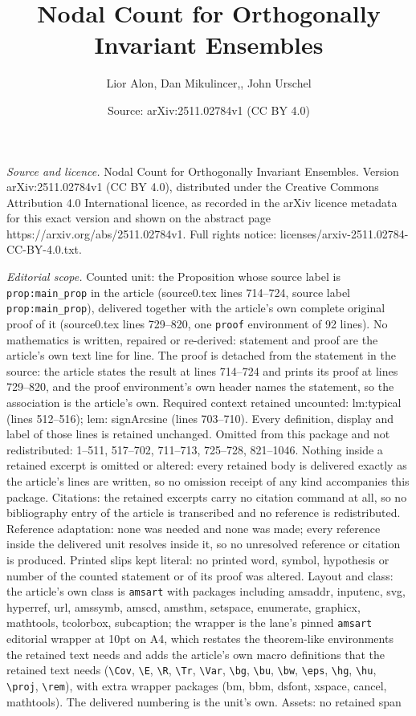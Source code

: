 \documentclass[10pt,a4paper]{amsart}
\title[Nodal Count for Orthogonally Invariant Ensembles]{Nodal Count for Orthogonally Invariant Ensembles}
\author{Lior Alon, Dan Mikulincer,, John Urschel}
\date{Source: arXiv:2511.02784v1 (CC BY 4.0)}
\begin{document}
\maketitle

\noindent\emph{Source and licence.} Nodal Count for Orthogonally Invariant Ensembles. Version arXiv:2511.02784v1 (CC BY 4.0), distributed under the Creative Commons Attribution 4.0 International licence, as recorded in the arXiv licence metadata for this exact version and shown on the abstract page https://arxiv.org/abs/2511.02784v1. Full rights notice: licenses/arxiv-2511.02784-CC-BY-4.0.txt.\par\smallskip

\noindent\textit{Editorial scope.} Counted unit: the Proposition whose source label is \texttt{prop:main\_prop} in the article (source0.tex lines 714--724, source label \texttt{prop:main\_prop}), delivered together with the article's own complete original proof of it (source0.tex lines 729--820, one \texttt{proof} environment of 92 lines). No mathematics is written, repaired or re-derived: statement and proof are the article's own text line for line. The proof is detached from the statement in the source: the article states the result at lines 714--724 and prints its proof at lines 729--820, and the proof environment's own header names the statement, so the association is the article's own. Required context retained uncounted: lm:typical (lines 512--516); lem: signArcsine (lines 703--710). Every definition, display and label of those lines is retained unchanged. Omitted from this package and not redistributed: 1--511, 517--702, 711--713, 725--728, 821--1046. Nothing inside a retained excerpt is omitted or altered: every retained body is delivered exactly as the article's lines are written, so no omission receipt of any kind accompanies this package. Citations: the retained excerpts carry no citation command at all, so no bibliography entry of the article is transcribed and no reference is redistributed. Reference adaptation: none was needed and none was made; every reference inside the delivered unit resolves inside it, so no unresolved reference or citation is produced. Printed slips kept literal: no printed word, symbol, hypothesis or number of the counted statement or of its proof was altered. Layout and class: the article's own class is \texttt{amsart} with packages including amsaddr, inputenc, svg, hyperref, url, amssymb, amscd, amsthm, setspace, enumerate, graphicx, mathtools, tcolorbox, subcaption; the wrapper is the lane's pinned \texttt{amsart} editorial wrapper at 10pt on A4, which restates the theorem-like environments the retained text needs and adds the article's own macro definitions that the retained text needs (\texttt{\textbackslash Cov}, \texttt{\textbackslash E}, \texttt{\textbackslash R}, \texttt{\textbackslash Tr}, \texttt{\textbackslash Var}, \texttt{\textbackslash bg}, \texttt{\textbackslash bu}, \texttt{\textbackslash bw}, \texttt{\textbackslash eps}, \texttt{\textbackslash hg}, \texttt{\textbackslash hu}, \texttt{\textbackslash proj}, \texttt{\textbackslash rem}), with extra wrapper packages (bm, bbm, dsfont, xspace, cancel, mathtools). The delivered numbering is the unit's own. Assets: no retained span 
\end{document}
